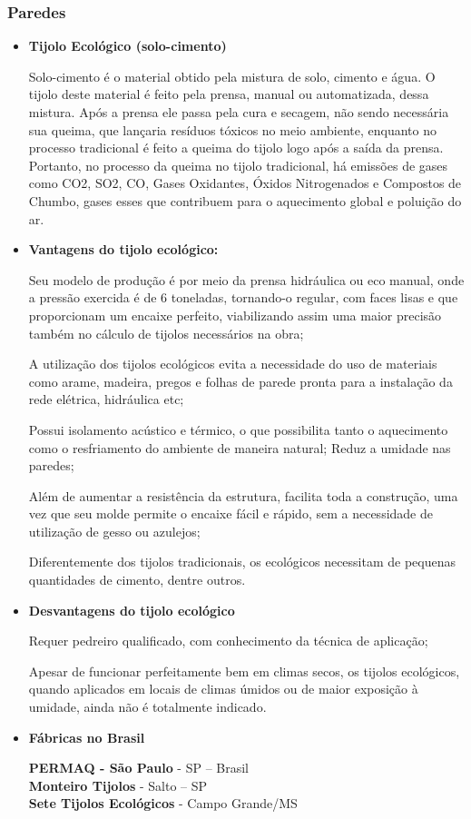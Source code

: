 \subsubsection{Paredes}
\begin{itemize}

\item \textbf{Tijolo Ecológico (solo-cimento)}

	Solo-cimento é o material obtido pela mistura de solo, cimento e água. O tijolo deste material é feito pela prensa, manual ou automatizada, dessa mistura. Após a prensa ele passa pela cura e secagem, não sendo necessária sua queima, que lançaria resíduos tóxicos no meio ambiente, enquanto no processo tradicional é feito a queima do tijolo logo após a saída da prensa. Portanto, no processo da queima no tijolo tradicional, há emissões de gases como \gls{CO2}, \gls{SO2}, \gls{CO}, Gases Oxidantes, Óxidos Nitrogenados e Compostos de Chumbo, gases esses que contribuem para o aquecimento global e poluição do ar.\cite{Castro2011}

\item \textbf{Vantagens do tijolo ecológico:}

	Seu modelo de produção é por meio da prensa hidráulica ou eco manual, onde a pressão exercida é de 6 toneladas, tornando-o regular, com faces lisas e que proporcionam um encaixe perfeito, viabilizando assim uma maior precisão também no cálculo de tijolos necessários na obra;

	A utilização dos tijolos ecológicos evita a necessidade do uso de materiais como arame, madeira, pregos e folhas de parede pronta para a instalação da rede elétrica, hidráulica etc;

	Possui isolamento acústico e térmico, o que possibilita tanto o aquecimento como o resfriamento do ambiente de maneira natural;
Reduz a umidade nas paredes;
	
	Além de aumentar a resistência da estrutura, facilita toda a construção, uma vez que seu molde permite o encaixe fácil e rápido, sem a necessidade de utilização de gesso ou azulejos;
	
	Diferentemente dos tijolos tradicionais, os ecológicos necessitam de pequenas quantidades de cimento, dentre outros.

\item \textbf{Desvantagens do tijolo ecológico}

	Requer pedreiro qualificado, com conhecimento da técnica de aplicação;

	Apesar de funcionar perfeitamente bem em climas secos, os tijolos ecológicos, quando aplicados em locais de climas úmidos ou de maior exposição à umidade, ainda não é totalmente indicado.

\item \textbf{Fábricas no Brasil}

\textbf{PERMAQ - São Paulo} - SP – Brasil\\
\textbf{Monteiro Tijolos} - Salto – SP\\
\textbf{Sete Tijolos Ecológicos} - Campo Grande/MS

\end{itemize}

